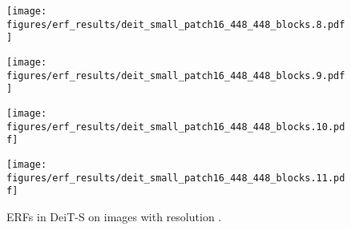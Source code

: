\documentclass{article}
\begin{document}
\begin{figure}[tb]
\begin{minipage}[t]{0.13\hsize}
    \texttt{[image: figures/erf\_results/deit\_small\_patch16\_448\_448\_blocks.8.pdf]}
    \label{figure:erf_deit_448:8}
  \end{minipage}
  \begin{minipage}[t]{0.13\hsize}
    \centering
    \texttt{[image: figures/erf\_results/deit\_small\_patch16\_448\_448\_blocks.9.pdf]}
    \label{figure:erf_deit_448:9}
  \end{minipage}
  \begin{minipage}[t]{0.13\hsize}
    \centering
    \texttt{[image: figures/erf\_results/deit\_small\_patch16\_448\_448\_blocks.10.pdf]}
    \label{figure:erf_deit_448:10}
  \end{minipage}
  \begin{minipage}[t]{0.13\hsize}
    \centering
    \texttt{[image: figures/erf\_results/deit\_small\_patch16\_448\_448\_blocks.11.pdf]}
    \label{figure:erf_deit_448:11}
  \end{minipage}
  \caption{ERFs in DeiT-S \cite{touvron2020training} on images with resolution .}
    \label{figure:erf_deit_448}
\end{figure} 
\end{document}
